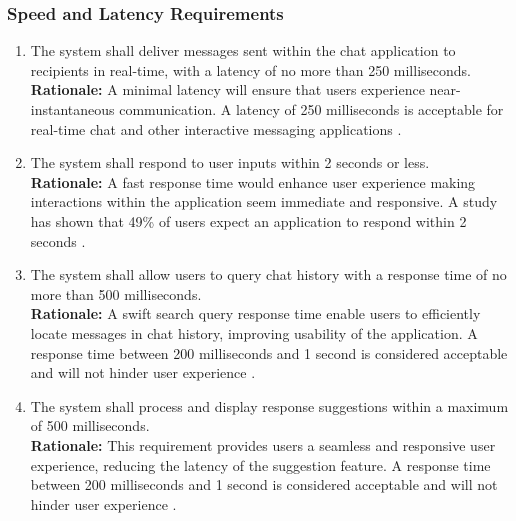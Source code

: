 \documentclass[]{article}
\begin{document}
\subsubsection{Speed and Latency Requirements}
\label{ssub:speed_and_latency_requirements}
\begin{enumerate}[{PR-SL}1. ]
	\item The system shall deliver messages sent within the chat application to recipients in real-time, with a latency
	      of no more than 250 milliseconds. \\
	      {\bf Rationale:} A minimal latency will ensure that users experience near-instantaneous communication.
	      A latency of 250 milliseconds is acceptable for real-time chat and other interactive messaging applications
	      \cite{3c}.
	\item The system shall respond to user inputs within 2 seconds or less. \\
	      {\bf Rationale:} A fast response time would enhance user experience making interactions within the application
	      seem immediate and responsive. A study has shown that 49\% of users expect an application to respond within 2 seconds
	      \cite{4c}.
	\item The system shall allow users to query chat history with a response time of no more than 500 milliseconds. \\
	      {\bf Rationale:} A swift search query response time enable users to efficiently locate messages in chat history, improving
	      usability of the application. A response time between 200 milliseconds and 1 second is considered
	      acceptable and will not hinder user experience
	      \cite{5c}.
	\item The system shall process and display response suggestions within a maximum of 500 milliseconds. \\
	      {\bf Rationale:} This requirement provides users a seamless and responsive user experience, reducing
	      the latency of the suggestion feature. A response time between 200 milliseconds and 1 second is considered
	      acceptable and will not hinder user experience
	      \cite{5c}.
\end{enumerate}
\end{document}
